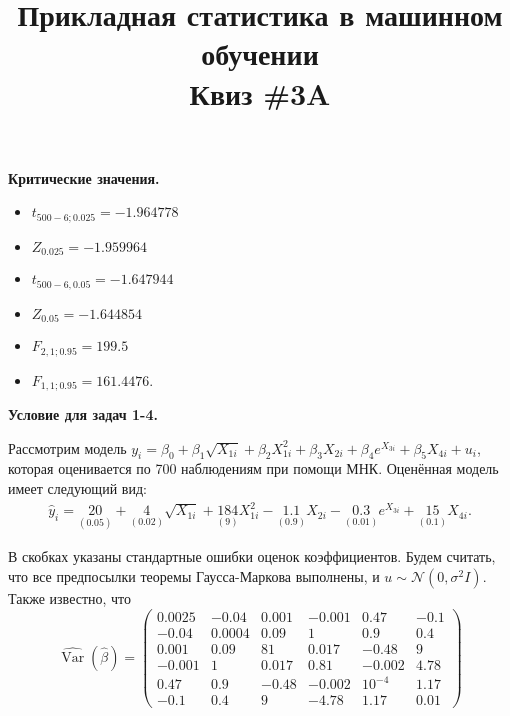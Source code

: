 \documentclass[10pt, a4paper]{extarticle}
\title{{\normalsize Прикладная статистика в машинном обучении} \\ \vspace{0.5em} Квиз \#3A}
\author{\rule{15cm}{0.4pt}}
\DeclareMathOperator{\Var}{Var}
\begin{document}
	
	\maketitle
	
	\begin{center}
		{\large \textbf{Критические значения.}}
		\begin{multicols}{3}
		\begin{itemize}
			\item $t_{500-6; 0.025} = -1.964778$
			\item $Z_{0.025} = -1.959964$
			\item $t_{500-6, 0.05} = -1.647944$
			\item $Z_{0.05} = -1.644854$
			\item $F_{2, 1; 0.95} = 199.5$
			\item $F_{1, 1; 0.95} = 161.4476$.
		\end{itemize}
	\end{multicols}	
	\end{center}
	\vspace{1em}
	
	\begin{center}
	{\large \textbf{Условие для задач 1-4.}}
	\end{center}
	
	Рассмотрим модель $y_i = \beta_0 + \beta_1\sqrt{X_{1i}} + \beta_2X^2_{1i} + \beta_3X_{2i} + \beta_4e^{X_{3i}} + \beta_5X_{4i} + u_i$, которая оценивается по 700 наблюдениям при помощи МНК. Оценённая модель имеет следующий вид:
	\begin{align*}
		\hat{y}_i = \underset{(0.05)}{20} + \underset{(0.02)}{4}\sqrt{X_{1i}} + \underset{(9)}{184}X^2_{1i} - \underset{(0.9)}{1.1}X_{2i} - \underset{(0.01)}{0.3}e^{X_{3i}} + \underset{(0.1)}{15}X_{4i}.
	\end{align*}
	
	В скобках указаны стандартные ошибки оценок коэффициентов. Будем считать, что все предпосылки теоремы Гаусса-Маркова выполнены, и $u \sim \mathcal{N}(0, \sigma^2I)$. Также известно, что
	\[
	\hat{\Var}(\hat{\beta}) = \begin{pmatrix}
		0.0025 & -0.04 & 0.001 & -0.001  & 0.47 & -0.1 \\
		-0.04  & 0.0004 & 0.09 & 1 & 0.9 & 0.4 \\
		0.001  & 0.09 & 81 & 0.017 & -0.48 & 9 \\
		-0.001 & 1 & 0.017 & 0.81 & -0.002 & 4.78 \\
		0.47 & 0.9 & -0.48 & -0.002 & 10^{-4} & 1.17 \\
		-0.1 & 0.4 & 9 & -4.78 & 1.17 &  0.01
	\end{pmatrix}
	\]
	\vspace{1em}
	
\end{document}
